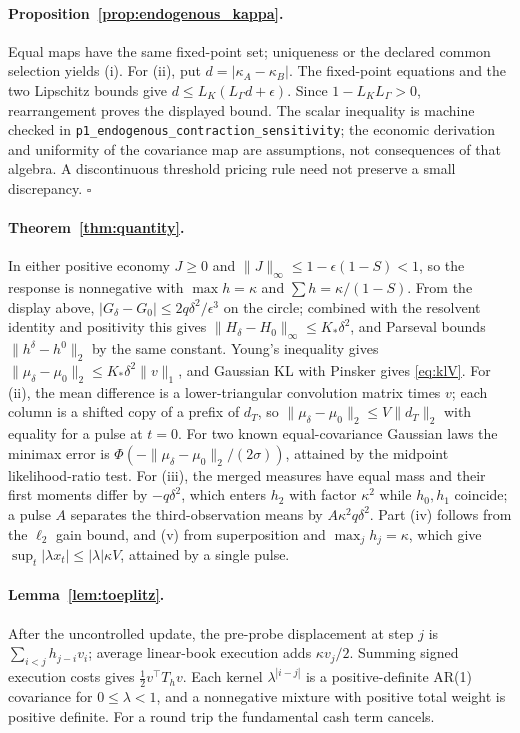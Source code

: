 \documentclass[12pt]{article}
\theoremstyle{definition}
\theoremstyle{remark}
\begin{document}
\paragraph{Proposition~\ref{prop:endogenous_kappa}.} Equal maps have the same fixed-point set; uniqueness or the declared common selection yields (i). For (ii), put $d=|\kappa_A-\kappa_B|$. The fixed-point equations and the two Lipschitz bounds give $d\le L_K(L_\Gamma d+\epsilon)$. Since $1-L_KL_\Gamma>0$, rearrangement proves the displayed bound. The scalar inequality is machine checked in \nolinkurl{p1_endogenous_contraction_sensitivity}; the economic derivation and uniformity of the covariance map are assumptions, not consequences of that algebra. A discontinuous threshold pricing rule need not preserve a small discrepancy. $\square$

\paragraph{Theorem~\ref{thm:quantity}.} In either positive economy $J\ge0$ and $\|J\|_\infty\le1-\epsilon(1-S)<1$, so the response is nonnegative with $\max h=\kappa$ and $\sum h=\kappa/(1-S)$. From the display above, $|G_\delta-G_0|\le2q\delta^2/\epsilon^3$ on the circle; combined with the resolvent identity and positivity this gives $\|H_\delta-H_0\|_\infty\le K_*\delta^2$, and Parseval bounds $\|h^\delta-h^0\|_2$ by the same constant. Young's inequality gives $\|\mu_\delta-\mu_0\|_2\le K_*\delta^2\|v\|_1$, and Gaussian KL with Pinsker gives \eqref{eq:klV}. For (ii), the mean difference is a lower-triangular convolution matrix times $v$; each column is a shifted copy of a prefix of $d_T$, so $\|\mu_\delta-\mu_0\|_2\le V\|d_T\|_2$ with equality for a pulse at $t=0$. For two known equal-covariance Gaussian laws the minimax error is $\Phi(-\|\mu_\delta-\mu_0\|_2/(2\sigma))$, attained by the midpoint likelihood-ratio test. For (iii), the merged measures have equal mass and their first moments differ by $-q\delta^2$, which enters $h_2$ with factor $\kappa^2$ while $h_0,h_1$ coincide; a pulse $A$ separates the third-observation means by $A\kappa^2q\delta^2$. Part (iv) follows from the $\ell_2$ gain bound, and (v) from superposition and $\max_jh_j=\kappa$, which give $\sup_t|\lambda x_t|\le|\lambda|\kappa V$, attained by a single pulse.

\paragraph{Lemma~\ref{lem:toeplitz}.} After the uncontrolled update, the pre-probe displacement at step $j$ is $\sum_{i<j}h_{j-i}v_i$; average linear-book execution adds $\kappa v_j/2$. Summing signed execution costs gives $\tfrac12v^\top T_hv$. Each kernel $\lambda^{|i-j|}$ is a positive-definite AR(1) covariance for $0\le\lambda<1$, and a nonnegative mixture with positive total weight is positive definite. For a round trip the fundamental cash term cancels.
\end{document}
